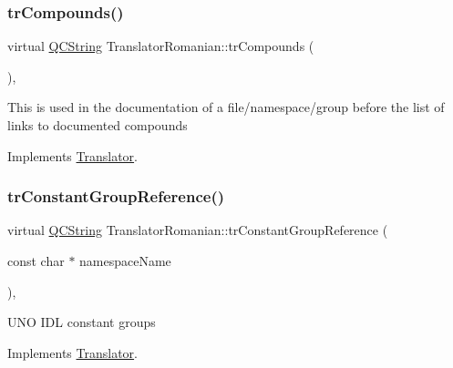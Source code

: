 \mbox{\label{class_translator_romanian_ae16d4d831222afcb6f23dc19974b582d}} 
\subsubsection{\texorpdfstring{trCompounds()}{trCompounds()}}
{\footnotesize\ttfamily virtual \mbox{\hyperlink{class_q_c_string}{Q\+C\+String}} Translator\+Romanian\+::tr\+Compounds (\begin{DoxyParamCaption}{ }\end{DoxyParamCaption})\hspace{0.3cm}{\ttfamily [inline]}, {\ttfamily [virtual]}}

This is used in the documentation of a file/namespace/group before the list of links to documented compounds 

Implements \mbox{\hyperlink{class_translator}{Translator}}.

\mbox{\label{class_translator_romanian_af99a0bd08afefdab08ca45c237dbaefb}} 
\subsubsection{\texorpdfstring{trConstantGroupReference()}{trConstantGroupReference()}}
{\footnotesize\ttfamily virtual \mbox{\hyperlink{class_q_c_string}{Q\+C\+String}} Translator\+Romanian\+::tr\+Constant\+Group\+Reference (\begin{DoxyParamCaption}\item[{const char $\ast$}]{namespace\+Name }\end{DoxyParamCaption})\hspace{0.3cm}{\ttfamily [inline]}, {\ttfamily [virtual]}}

U\+NO I\+DL constant groups 

Implements \mbox{\hyperlink{class_translator}{Translator}}.

\mbox{\label{class_translator_romanian_a845c68ba03622b749be31cff6cff1317}} 
